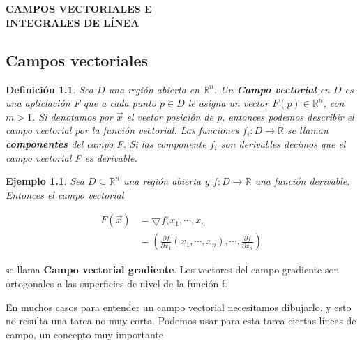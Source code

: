 \documentclass[11pt]{book}
\numberwithin{equation}{section}
\theoremstyle{plain}  %
\newtheorem{Def}{Definición}[chapter]
\newtheorem{Ej}{Ejemplo}[chapter]
\begin{document}
\chapter{}

\noindent \textbf{{\huge CAMPOS VECTORIALES E\\
INTEGRALES DE LÍNEA}}

\section{Campos vectoriales}

\begin{Def}
{\it
Sea $D$ una región abierta en $\mathbb{R}^{n}$. Un \textbf{Campo vectorial} en $D$ es una apliclación F que a cada punto $p \in D$ le asigna un vector $F(p) \in \mathbb{R}^{n}$, con $m>1$. Si denotamos por $\vec{x}$ el vector posición de p, entonces podemos describir el campo vectorial por la función vectorial. Las funciones $f_{i}: D \to \mathbb{R}$ se llaman \textbf{componentes} del campo F. Si las componente $f_{i}$ son derivables decimos que el campo vectorial F es derivable. 

}
\end{Def}
{\it
\begin{Ej}

Sea $D \subseteq \mathbb{R}^{n}$ una región abierta y $f: D \to \mathbb{R}$ una función derivable. Entonces el campo  vectorial 


\begin{align*}
	F(\vec{x})&=\bigtriangledown f(x_{1},\cdots,x_{n}\\
	&=(\frac{\partial f}{\partial x_{1}}(x_{1},\cdots,x_{n}),\cdots,\frac{\partial f}{\partial x_{n}})
\end{align*}

\end{Ej}
\noindent se llama \textbf{Campo vectorial gradiente}. Los vectores del campo gradiente son ortogonales a las superficies de nivel de la función f.
}
\vfill
En muchos casos para entender un campo vectorial necesitamos dibujarlo, y esto no resulta una tarea no muy corta. Podemos usar para esta tarea ciertas líneas de campo, un concepto muy importante
\newpage
\end{document}
